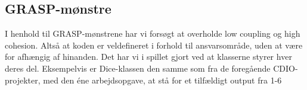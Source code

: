 \newpage
\subsection{GRASP-mønstre}

I henhold til GRASP-mønstrene har vi forsøgt at overholde low coupling og high cohesion. Altså at koden er veldefineret i forhold til ansvarsområde, uden at være for afhængig af hinanden. Det har vi i spillet gjort ved at klasserne styrer hver deres del. Eksempelvis er Dice-klassen den samme som fra de foregående CDIO-projekter, med den éne arbejdsopgave, at stå for et tilfældigt output fra 1-6